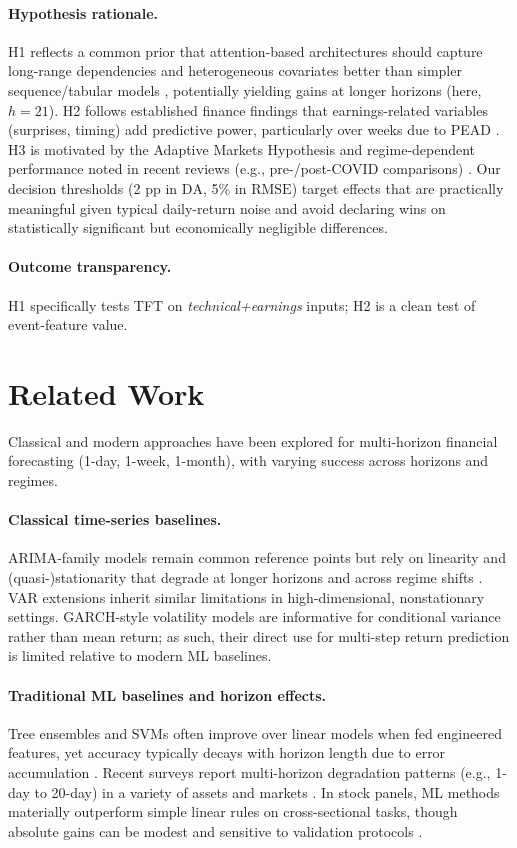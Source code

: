 \documentclass[10pt,twocolumn]{article}
\newcommand{\rmse}{\ensuremath{\mathrm{RMSE}}}
\newcommand{\da}{\ensuremath{\mathrm{DA}}}
\begin{document}
\paragraph{Hypothesis rationale.}
H1 reflects a common prior that attention-based architectures should capture long-range dependencies and heterogeneous covariates better than simpler sequence/tabular models \citep{lim2021temporal}, potentially yielding gains at longer horizons (here, $h{=}21$). H2 follows established finance findings that earnings-related variables (surprises, timing) add predictive power, particularly over weeks due to PEAD \citep{bernard1989,schnaubelt2020}. H3 is motivated by the Adaptive Markets Hypothesis \citep{lo2004} and regime-dependent performance noted in recent reviews (e.g., pre-/post-COVID comparisons) \citep{zhang2023review}. Our decision thresholds (2 pp in \da{}, 5\% in \rmse{}) target effects that are practically meaningful given typical daily-return noise and avoid declaring wins on statistically significant but economically negligible differences.

\paragraph{Outcome transparency.}
H1 specifically tests TFT on \emph{technical+earnings} inputs; H2 is a clean test of event-feature value.

\section{Related Work}
Classical and modern approaches have been explored for multi-horizon financial forecasting (1-day, 1-week, 1-month), with varying success across horizons and regimes.

\paragraph{Classical time-series baselines.} ARIMA-family models remain common reference points but rely on linearity and (quasi-)stationarity that degrade at longer horizons and across regime shifts \citep{box2015}. VAR extensions inherit similar limitations in high-dimensional, nonstationary settings. GARCH-style volatility models are informative for conditional variance rather than mean return; as such, their direct use for multi-step return prediction is limited relative to modern ML baselines.

\paragraph{Traditional ML baselines and horizon effects.} Tree ensembles and SVMs often improve over linear models when fed engineered features, yet accuracy typically decays with horizon length due to error accumulation \citep[][and references therein]{gu2018,chen2016xgboost}. Recent surveys report multi-horizon degradation patterns (e.g., 1-day to 20-day) in a variety of assets and markets \citep{zhang2023review}. In stock panels, ML methods materially outperform simple linear rules on cross-sectional tasks, though absolute gains can be modest and sensitive to validation protocols \citep{gu2018}.
\end{document}
